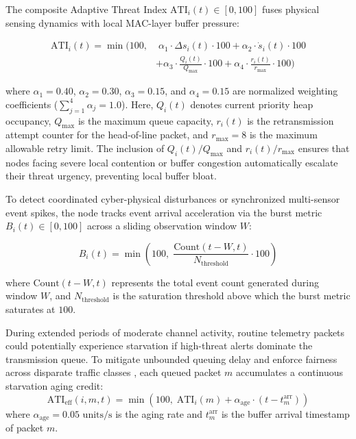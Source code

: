 \documentclass[preprint,review,12pt]{elsarticle}
\begin{document}
The composite Adaptive Threat Index $\text{ATI}_i(t) \in [0, 100]$ fuses physical sensing dynamics with local MAC-layer buffer pressure:

\begin{align}
\label{eq:ati_formula}
\text{ATI}_i(t) = \min\Big(100, &\; \alpha_1 \cdot \Delta s_i(t) \cdot 100 + \alpha_2 \cdot \dot{s}_i(t) \cdot 100 \nonumber \\
&+ \alpha_3 \cdot \frac{Q_i(t)}{Q_{\text{max}}} \cdot 100 + \alpha_4 \cdot \frac{r_i(t)}{r_{\text{max}}} \cdot 100 \Big)
\end{align}

where $\alpha_1 = 0.40$, $\alpha_2 = 0.30$, $\alpha_3 = 0.15$, and $\alpha_4 = 0.15$ are normalized weighting coefficients ($\sum_{j=1}^4 \alpha_j = 1.0$). Here, $Q_i(t)$ denotes current priority heap occupancy, $Q_{\text{max}}$ is the maximum queue capacity, $r_i(t)$ is the retransmission attempt counter for the head-of-line packet, and $r_{\text{max}} = 8$ is the maximum allowable retry limit. The inclusion of $Q_i(t)/Q_{\text{max}}$ and $r_i(t)/r_{\text{max}}$ ensures that nodes facing severe local contention or buffer congestion automatically escalate their threat urgency, preventing local buffer bloat.

To detect coordinated cyber-physical disturbances or synchronized multi-sensor event spikes, the node tracks event arrival acceleration via the burst metric $B_i(t) \in [0, 100]$ across a sliding observation window $W$:

\begin{equation}

\label{eq:burst_formula}

B_i(t) = \min\left(100, \; \frac{\text{Count}(t - W, t)}{N_{\text{threshold}}} \cdot 100\right)

\end{equation}

where $\text{Count}(t - W, t)$ represents the total event count generated during window $W$, and $N_{\text{threshold}}$ is the saturation threshold above which the burst metric saturates at $100$.

During extended periods of moderate channel activity, routine telemetry packets could potentially experience starvation if high-threat alerts dominate the transmission queue. To mitigate unbounded queuing delay and enforce fairness across disparate traffic classes \cite{lu2026dynamic}, each queued packet $m$ accumulates a continuous starvation aging credit:
\begin{equation}
\label{eq:aging_credit}
\text{ATI}_{\text{eff}}(i, m, t) = \min\left(100, \; \text{ATI}_i(m) + \alpha_{\text{age}} \cdot (t - t_m^{\text{arr}})\right)
\end{equation}
where $\alpha_{\text{age}} = 0.05\text{ units/s}$ is the aging rate and $t_m^{\text{arr}}$ is the buffer arrival timestamp of packet $m$.
\end{document}
